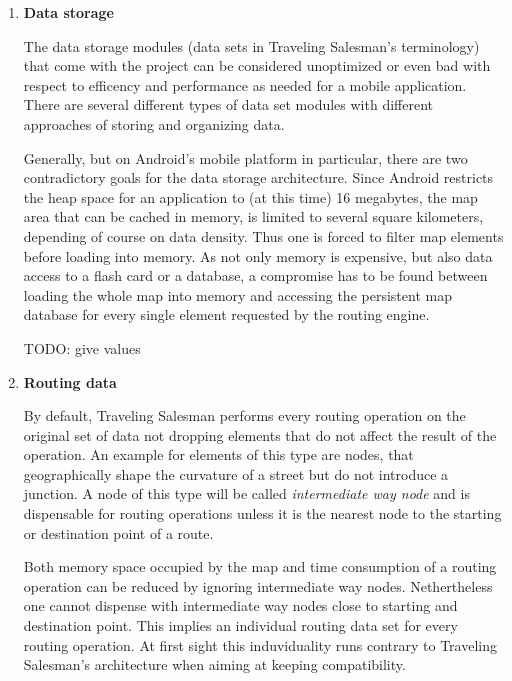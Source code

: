 \begin{enumerate}
	\item \textbf{Data storage}
	
		The data storage modules (data sets in Traveling Salesman's terminology) that come with the project can be considered unoptimized or even bad with respect to efficency and performance as needed for a mobile application. There are several different types of data set modules with different approaches of storing and organizing data.\newline
		
		Generally, but on Android's mobile platform in particular, there are two contradictory goals for the data storage architecture. Since Android restricts the heap space for an application to (at this time) 16 megabytes, the map area that can be cached in memory, is limited to several square kilometers, depending of course on data density. Thus one is forced to filter map elements before loading into memory.
		As not only memory is expensive, but also data access to a flash card or a database, a compromise has to be found between loading the whole map into memory and accessing the persistent map database for every single element requested by the routing engine. \newline
		
		TODO: give values
		
	\item \textbf{Routing data}
	
		By default, Traveling Salesman performs every routing operation on the original set of data not dropping elements that do not affect the result of the operation. An example for elements of this type are nodes, that geographically shape the curvature of a street but do not introduce a junction. A node of this type will be called \emph{intermediate way node} and is dispensable for routing operations unless it is the nearest node to the starting or destination point of a route.\newline
		
		Both memory space occupied by the map and time consumption of a routing operation can be reduced by ignoring intermediate way nodes. Nethertheless one cannot dispense with intermediate way nodes close to starting and destination point. This implies an individual routing data set for every routing operation. At first sight this induviduality runs contrary to Traveling Salesman's architecture when aiming at keeping compatibility.\newline		
		

\end{enumerate}
